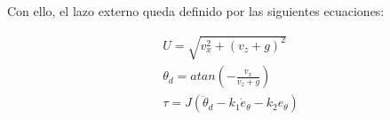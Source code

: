 Con ello, el lazo externo queda definido por las siguientes ecuaciones:

\begin{equation*}
    \begin{aligned}
        U=\sqrt{v_x^2+(v_z+g)^2}\\
        \theta_d=atan\left(-\frac{v_x}{v_z+g}\right)\\
        \tau=J(\ddot{\theta}_d-k_1\dot{e}_\theta-k_2 e_\theta)\\
    \end{aligned}
\end{equation*}














